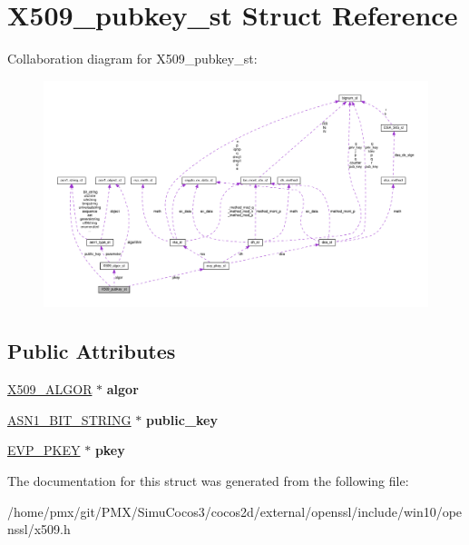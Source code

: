 \hypertarget{structX509__pubkey__st}{}\section{X509\+\_\+pubkey\+\_\+st Struct Reference}
\label{structX509__pubkey__st}


Collaboration diagram for X509\+\_\+pubkey\+\_\+st\+:
\nopagebreak
\begin{figure}[H]
\begin{center}
\leavevmode
\includegraphics[width=350pt]{structX509__pubkey__st__coll__graph}
\end{center}
\end{figure}
\subsection*{Public Attributes}
\begin{DoxyCompactItemize}
\item 
\mbox{\label{structX509__pubkey__st_a0fb9c56d9396c7fffdb67e9c758be102}} 
\hyperlink{structX509__algor__st}{X509\+\_\+\+A\+L\+G\+OR} $\ast$ {\bfseries algor}
\item 
\mbox{\label{structX509__pubkey__st_ae2fae3c3fa6b2d0a28b5873da1361250}} 
\hyperlink{structasn1__string__st}{A\+S\+N1\+\_\+\+B\+I\+T\+\_\+\+S\+T\+R\+I\+NG} $\ast$ {\bfseries public\+\_\+key}
\item 
\mbox{\label{structX509__pubkey__st_a3ffae0e6f6a9c34c52339de00d8a8234}} 
\hyperlink{structevp__pkey__st}{E\+V\+P\+\_\+\+P\+K\+EY} $\ast$ {\bfseries pkey}
\end{DoxyCompactItemize}


The documentation for this struct was generated from the following file\+:\begin{DoxyCompactItemize}
\item 
/home/pmx/git/\+P\+M\+X/\+Simu\+Cocos3/cocos2d/external/openssl/include/win10/openssl/x509.\+h\end{DoxyCompactItemize}
